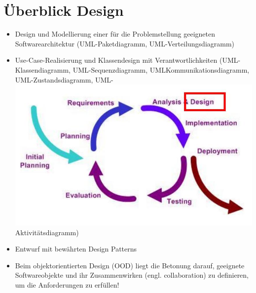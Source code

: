 \section*{Überblick Design}
\begin{itemize}
  \item Design und Modellierung einer für die Problemstellung geeigneten Softwarearchitektur (UML-Paketdiagramm, UML-Verteilungsdiagramm)
  \item Use-Case-Realisierung und Klassendesign mit Verantwortlichkeiten (UML-Klassendiagramm, UML-Sequenzdiagramm, UMLKommunikationsdiagramm, UML-Zustandsdiagramm, UML-\\
\includegraphics[width=\linewidth]{images/2025_01_02_6eafa38dd4ae10c9a392g-13} Aktivitätsdiagramm)
  \item Entwurf mit bewährten Design Patterns
  \item Beim objektorientierten Design (OOD) liegt die Betonung darauf, geeignete Softwareobjekte und ihr Zusammenwirken (engl. collaboration) zu definieren, um die Anforderungen zu erfüllen!
\end{itemize}

